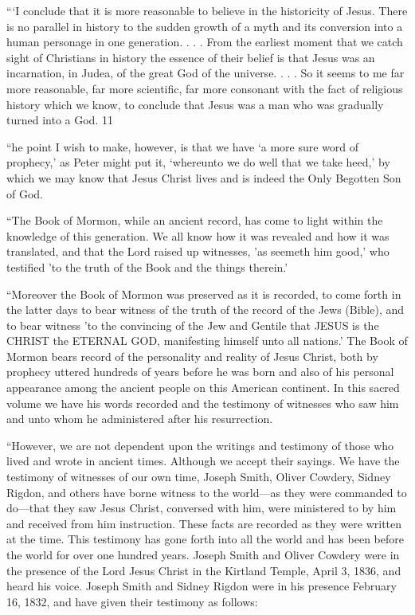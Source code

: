 ```I conclude that it is more reasonable to believe in the historicity of Jesus. There is no
parallel in history to the sudden growth of a myth and its conversion into a human personage
in one generation. . . . From the earliest moment that we catch sight of Christians in history
the essence of their belief is that Jesus was an incarnation, in Judea, of the great God of the
universe. . . . So it seems to me far more reasonable, far more scientific, far more consonant
with the fact of religious history which we know, to conclude that Jesus was a man who was
gradually turned into a God. 11

``he point I wish to make, however, is that we have `a more sure word of prophecy,' as Peter
might put it, `whereunto we do well that we take heed,' by which we may know that Jesus
Christ lives and is indeed the Only Begotten Son of God.

``The Book of Mormon, while an ancient record, has come to light within the knowledge of
this generation. We all know how it was revealed and how it was translated, and that the
Lord raised up witnesses, 'as seemeth him good,' who testified 'to the truth of the Book and
the things therein.'

``Moreover the Book of Mormon was preserved as it is recorded, to come forth in the latter
days to bear witness of the truth of the record of the Jews (Bible), and to bear witness 'to the
convincing of the Jew and Gentile that JESUS is the CHRIST the ETERNAL GOD,
manifesting himself unto all nations.' The Book of Mormon bears record of the personality
and reality of Jesus Christ, both by prophecy uttered hundreds of years before he was born
and also of his personal appearance among the ancient people on this American continent. In
this sacred volume we have his words recorded and the testimony of witnesses who saw him
and unto whom he administered after his resurrection.

``However, we are not dependent upon the writings and testimony of those who lived and
wrote in ancient times. Although we accept their sayings. We have the testimony of
witnesses of our own time, Joseph Smith, Oliver Cowdery, Sidney Rigdon, and others have
borne witness to the world—as they were commanded to do—that they saw Jesus Christ,
conversed with him, were ministered to by him and received from him instruction. These
facts are recorded as they were written at the time. This testimony has gone forth into all the
world and has been before the world for over one hundred years. Joseph Smith and Oliver
Cowdery were in the presence of the Lord Jesus Christ in the Kirtland Temple, April 3, 1836,
and heard his voice. Joseph Smith and Sidney Rigdon were in his presence February 16,
1832, and have given their testimony as follows:

